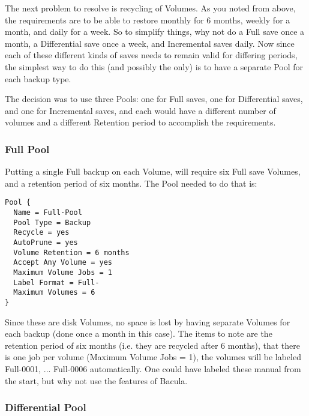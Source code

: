 The next problem to resolve is recycling of Volumes. As you noted from above,
the requirements are to be able to restore monthly for 6 months, weekly for a
month, and daily for a week. So to simplify things, why not do a Full save
once a month, a Differential save once a week, and Incremental saves daily.
Now since each of these different kinds of saves needs to remain valid for
differing periods, the simplest way to do this (and possibly the only) is to
have a separate Pool for each backup type. 

The decision was to use three Pools: one for Full saves, one for Differential
saves, and one for Incremental saves, and each would have a different number
of volumes and a different Retention period to accomplish the requirements. 
\label{FullPool}

\subsubsection*{Full Pool}

Putting a single Full backup on each Volume, will require six Full save
Volumes, and a retention period of six months. The Pool needed to do that is: 

\footnotesize
\begin{verbatim}
Pool {
  Name = Full-Pool
  Pool Type = Backup
  Recycle = yes
  AutoPrune = yes
  Volume Retention = 6 months
  Accept Any Volume = yes
  Maximum Volume Jobs = 1
  Label Format = Full-
  Maximum Volumes = 6
}
\end{verbatim}
\normalsize

Since these are disk Volumes, no space is lost by having separate Volumes for
each backup (done once a month in this case). The items to note are the
retention period of six months (i.e. they are recycled after 6 months), that
there is one job per volume (Maximum Volume Jobs = 1), the volumes will be
labeled Full-0001, ... Full-0006 automatically. One could have labeled these
manual from the start, but why not use the features of Bacula. 
\label{DiffPool}

\subsubsection*{Differential Pool}

